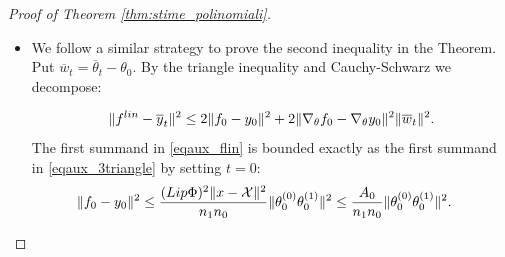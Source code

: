 \documentclass[10pt,a4paper]{amsart}
\newcommand{\X}{\mathcal{X}}
\newcommand{\lin}{{\textup{lin}}}
\newcommand{\norm}[2]{
    \|#1\|_{#2}
}
\newcommand{\s}{\psi}
\begin{document}
\begin{proof}[Proof of Theorem \ref{thm:stime_polinomiali}]
\begin{itemize}
        Hence,
        \begin{align}
            \label{eqaux_1stsum}
            \norm{y_t- f_t}{}^2 &\le \frac{(\textup{Lip}\Phi)^2\norm{x-\X}{}}{n_0n_1}\norm{\theta^{(0)}_t\theta^{(1)}_t}{}^2\\
            &\le \frac{A_0}{n_0}\norm{\theta^{(0)}_0\theta^{(1)}_0}{}^2 +\frac{A_1t^2}{n_0n_1}\norm{\theta^{(0)}_0}{}^2\s(\theta_0)^2 + \frac{A_2\norm{\theta^{(1)}_0}{}^2t^4}{n_1^2n_0}\s(\theta_0)^4 \\
            &\quad + \frac{A_3t^6}{n_1^2n_0}\s(\theta_0)^6 + \frac{A_4t^2}{n_1n_0}\norm{\theta^{(1)}_0}{}^4\s(\theta_0)^2 + \frac{A_5t^4\norm{\theta^{(1)}_0}{}^2}{n_1^2n_0}\s(\theta_0)^4.
        \end{align}
        with $A_0 = (\textup{Lip}\Phi)^2\norm{x-\X}{}^2$,
        $A_1 = a_1^2$, $A_2= a_0^2$, $A_3 = a_1^2a_0^2$, $A_4 = {a'}_0^2$ and $A_5 = {a'}_0^2a_1^2$.

\item We follow a similar strategy to prove the second inequality in the Theorem. 
Put $\overline w_t = \overline \theta_t - \theta_0$.
By the triangle inequality and Cauchy-Schwarz we decompose:

\begin{align}
    \label{eqaux_flin}
        \norm{f^\lin-\overline y_t}{}^2 \le 2\norm{f_0 - y_0}{}^2 + 2\norm{\nabla_\theta f_0 - \nabla_\theta y_0}{}^2\norm{\overline w_t}{}^2.
    \end{align}
    The first summand in \eqref{eqaux_flin} is bounded exactly as the first summand in \eqref{eqaux_3triangle} by setting $t=0$:
    \begin{align}
        \norm{f_0 - y_0}{}^2 &\le  \frac{(\textup{Lip}\Phi)^2 \norm{x-\X}{}^2}{n_1n_0} \norm{\theta_0^{(0)}\theta_0^{(1)} }{}^2 \le \frac{A_0}{n_1n_0}\norm{\theta_0^{(0)}\theta_0^{(1)} }{}^2.
    \end{align}


\end{itemize}
\end{proof}
\end{document}
